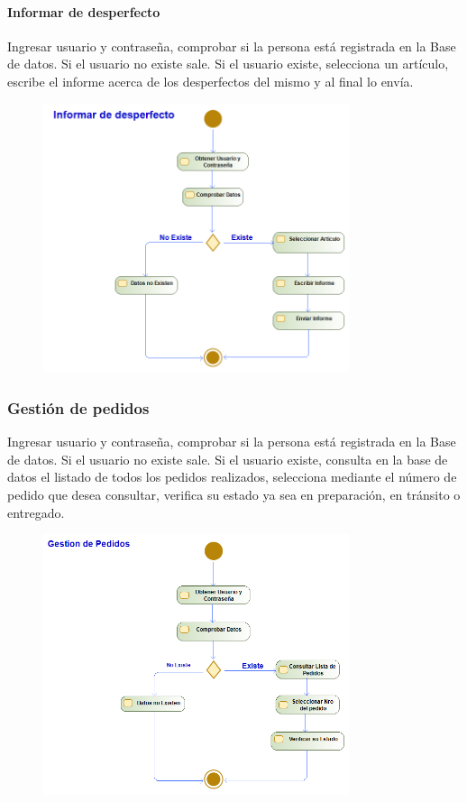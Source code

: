 \paragraph{Informar de desperfecto}
Ingresar usuario y contraseña, comprobar si la persona está registrada en la Base de datos. Si el usuario no existe sale. Si el usuario existe, selecciona un artículo, escribe el informe acerca de los desperfectos del mismo y al final lo envía.
\begin{figure}[H]
    \centering
    \includegraphics[width=0.8\textwidth]{Use_Cases/informar_de_desperfecto.png}
\end{figure}
\subsubsection{Gestión de pedidos}
Ingresar usuario y contraseña, comprobar si la persona está registrada en la Base de datos. Si el usuario no existe sale. Si el usuario existe, consulta en la base de datos el listado de todos los pedidos realizados, selecciona mediante el número de pedido que desea consultar, verifica su estado ya sea en preparación, en tránsito o entregado.
\begin{figure}[H]
    \centering
    \includegraphics[width=0.8\textwidth]{Use_Cases/gestion_de_pedidos.png}
\end{figure}
